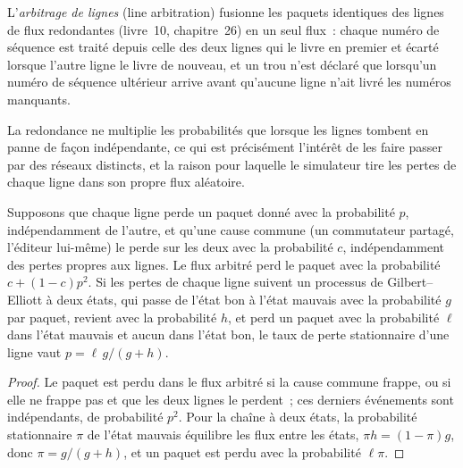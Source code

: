 \begin{definition}\label{def:ll:protocols-ii-binary-exchange-protocols:arbitration}
L'\emph{arbitrage de lignes} (line arbitration) fusionne les paquets identiques des lignes de flux redondantes (livre~10,
chapitre~26) en un seul flux~: chaque numéro de séquence est traité depuis celle des deux lignes qui le livre en premier et écarté lorsque l'autre
ligne le livre de nouveau, et un trou n'est déclaré que lorsqu'un numéro de séquence ultérieur arrive avant qu'aucune ligne n'ait livré les
numéros manquants.
\end{definition}

\label{lst:ll:protocols-ii-binary-exchange-protocols:arb}

La redondance ne multiplie les probabilités que lorsque les lignes tombent en panne de façon indépendante, ce qui est précisément l'intérêt de les faire passer par des
réseaux distincts, et la raison pour laquelle le simulateur tire les pertes de chaque ligne dans son propre flux aléatoire.

\begin{proposition}\label{prop:ll:protocols-ii-binary-exchange-protocols:both}
Supposons que chaque ligne perde un paquet donné avec la probabilité $p$, indépendamment de l'autre, et qu'une cause commune (un commutateur partagé,
l'éditeur lui-même) le perde sur les deux avec la probabilité $c$, indépendamment des pertes propres aux lignes. Le flux arbitré
perd le paquet avec la probabilité $c + (1 - c)p^2$. Si les pertes de chaque ligne suivent un processus de Gilbert--Elliott à deux états, qui passe
de l'état bon à l'état mauvais avec la probabilité $g$ par paquet, revient avec la probabilité $h$, et perd un paquet avec la probabilité $\ell$
dans l'état mauvais et aucun dans l'état bon, le taux de perte stationnaire d'une ligne vaut $p = \ell\, g/(g+h)$.
\end{proposition}

\begin{proof}
Le paquet est perdu dans le flux arbitré si la cause commune frappe, ou si elle ne frappe pas et que les deux lignes le perdent~; ces derniers
événements sont indépendants, de probabilité $p^2$. Pour la chaîne à deux états, la probabilité stationnaire $\pi$ de l'état mauvais
équilibre les flux entre les états, $\pi h = (1-\pi) g$, donc $\pi = g/(g+h)$, et un paquet est perdu avec la probabilité $\ell\pi$.
\end{proof}

